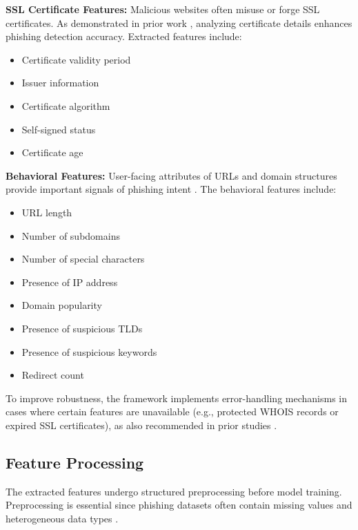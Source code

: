 \documentclass[conference]{IEEEtran}
\begin{document}
\textbf{SSL Certificate Features:} Malicious websites often misuse or forge SSL certificates. As demonstrated in prior work \cite{mdpi2022improved}, analyzing certificate details enhances phishing detection accuracy. Extracted features include:
\begin{itemize}
    \item Certificate validity period
    \item Issuer information
    \item Certificate algorithm
    \item Self-signed status
    \item Certificate age
\end{itemize}

\textbf{Behavioral Features:} User-facing attributes of URLs and domain structures provide important signals of phishing intent \cite{futureinternet2022behavior, academia2020cnn}. The behavioral features include:
\begin{itemize}
    \item URL length
    \item Number of subdomains
    \item Number of special characters
    \item Presence of IP address
    \item Domain popularity
    \item Presence of suspicious TLDs
    \item Presence of suspicious keywords
    \item Redirect count
\end{itemize}

To improve robustness, the framework implements error-handling mechanisms in cases where certain features are unavailable (e.g., protected WHOIS records or expired SSL certificates), as also recommended in prior studies \cite{acm2024features}.

\subsection{Feature Processing}
The extracted features undergo structured preprocessing before model training. Preprocessing is essential since phishing datasets often contain missing values and heterogeneous data types \cite{academia2024survey}.
\end{document}
